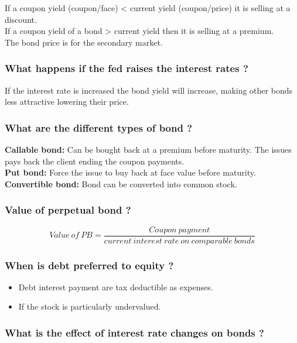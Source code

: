 \documentclass[11pt]{scrartcl} %
\begin{document}
If a coupon yield (coupon/face) < current yield (coupon/price) it is selling at a discount.\\
If a coupon yield of a bond > current yield then it is selling at a premium.\\

The bond price is for the secondary market.

\subsubsection{What happens if the fed raises the interest rates ?}

If the interest rate is increased the bond yield will increase, making other bonds less attractive lowering their price.

\subsubsection{What are the different types of bond ?}

\textbf{Callable bond:} Can be bought back at a premium before maturity. The issues pays back the client ending the coupon payments.\\
\textbf{Put bond:} Force the issue to buy back at face value before maturity.\\
\textbf{Convertible bond:} Bond can be converted into common stock.\\

\subsubsection{Value of perpetual bond ?}

\[ Value\:of\:PB = \frac{Coupon\:payment}{current\:interest\:rate\:on\:comparable\:bonds} \]

\subsubsection{When is debt preferred to equity ?}

\begin{itemize}
	\item Debt interest payment are tax deductible as expenses.
	\item If the stock is particularly undervalued.
\end{itemize}

\subsubsection{What is the effect of interest rate changes on bonds ?}
\end{document}
